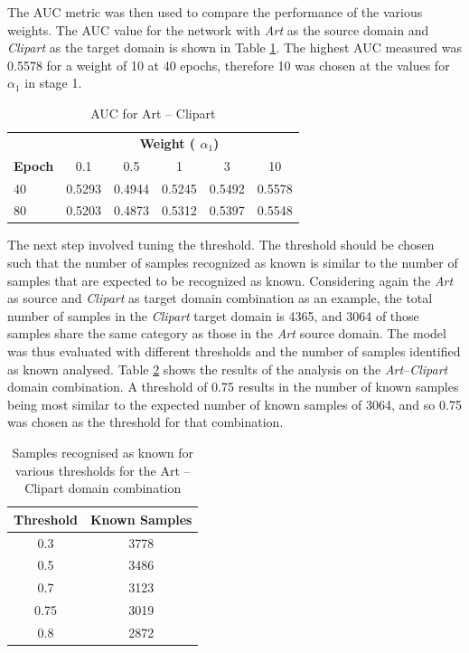 \documentclass[10pt,twocolumn,letterpaper]{article}
\begin{document}
The AUC metric was then used to compare the performance of the various weights. The AUC value for the network with \textit{Art} as the source domain and \textit{Clipart} as the target domain is shown in Table \ref{tab:auc}. The highest AUC measured was 0.5578 for a weight of 10 at 40 epochs, therefore 10 was chosen at the values for $\alpha_1$ in stage 1. 

\begin{table}[!htb]
  \centering
  \begin{tabular}{@{}|l|ccccc|@{}}
    \hline
     & \multicolumn{5}{c|}{\textbf{Weight ( $\alpha_1$)}}\\
 \textbf{Epoch} & 0.1 & 0.5 & 1 & 3 & 10 \\
    \hline 
    40 & 0.5293 & 0.4944 & 0.5245 & 0.5492 & 0.5578 \\
   80 & 0.5203 & 0.4873 & 0.5312 & 0.5397 & 0.5548 \\
    \hline
  \end{tabular}
  \caption{AUC for Art -- Clipart}
  \label{tab:auc}
\end{table}

The next step involved tuning the threshold. The threshold should be chosen such that the number of samples recognized as known is similar to the number of samples that are expected to be recognized as known. Considering again the \textit{Art} as source and \textit{Clipart} as target domain combination as an example, the total number of samples in the \textit{Clipart} target domain is 4365, and 3064 of those samples share the same category as those in the \textit{Art} source domain. The model was thus evaluated with different thresholds and the number of samples identified as known analysed. Table \ref{tab:threshold} shows the results of the analysis on the \textit{Art}--\textit{Clipart} domain combination. A threshold of 0.75 results in the number of known samples being most similar to the expected number of known samples of 3064, and so 0.75 was chosen as the threshold for that combination.

\begin{table}[!htb]
  \centering
  \begin{tabular}{@{}|cc|@{}}
    \hline
 \textbf{Threshold} & \textbf{Known Samples} \\
    \hline 
 0.3 & 3778 \\
 0.5 & 3486 \\
 0.7 & 3123 \\
 0.75 & 3019 \\
 0.8 & 2872 \\
    \hline
  \end{tabular}
  \caption{Samples recognised as known for various thresholds for the Art -- Clipart domain combination}
  \label{tab:threshold}
\end{table}
\end{document}
